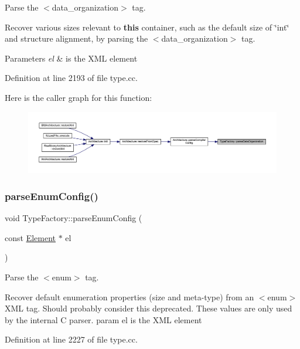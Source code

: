 Parse the $<$data\+\_\+organization$>$ tag. 

Recover various sizes relevant to {\bfseries{this}} container, such as the default size of \char`\"{}int\char`\"{} and structure alignment, by parsing the $<$data\+\_\+organization$>$ tag. 
\begin{DoxyParams}{Parameters}
{\em el} & is the X\+ML element \\
\hline
\end{DoxyParams}


Definition at line 2193 of file type.\+cc.

Here is the caller graph for this function\+:
\nopagebreak
\begin{figure}[H]
\begin{center}
\leavevmode
\includegraphics[width=350pt]{class_type_factory_a6e13c732148b6c5f78797d60e1a115f5_icgraph}
\end{center}
\end{figure}
\mbox{\label{class_type_factory_a8d10b37cae4c213ca3a613f454ada676}} 
\subsubsection{\texorpdfstring{parseEnumConfig()}{parseEnumConfig()}}
{\footnotesize\ttfamily void Type\+Factory\+::parse\+Enum\+Config (\begin{DoxyParamCaption}\item[{const \mbox{\hyperlink{class_element}{Element}} $\ast$}]{el }\end{DoxyParamCaption})}



Parse the $<$enum$>$ tag. 

Recover default enumeration properties (size and meta-\/type) from an $<$enum$>$ X\+ML tag. Should probably consider this deprecated. These values are only used by the internal C parser. param el is the X\+ML element 

Definition at line 2227 of file type.\+cc.

